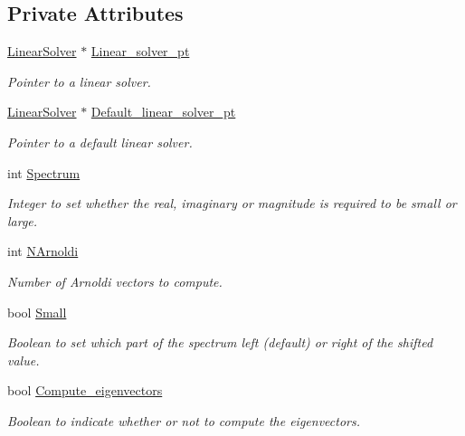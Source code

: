 \subsection*{Private Attributes}
\begin{DoxyCompactItemize}
\item 
\hyperlink{classoomph_1_1LinearSolver}{Linear\+Solver} $\ast$ \hyperlink{classoomph_1_1ARPACK_a647a45676349ba86abd5d2ff9aff022d}{Linear\+\_\+solver\+\_\+pt}
\begin{DoxyCompactList}\small\item\em Pointer to a linear solver. \end{DoxyCompactList}\item 
\hyperlink{classoomph_1_1LinearSolver}{Linear\+Solver} $\ast$ \hyperlink{classoomph_1_1ARPACK_ad6d487dfc1f84d8008e52fc87d83c644}{Default\+\_\+linear\+\_\+solver\+\_\+pt}
\begin{DoxyCompactList}\small\item\em Pointer to a default linear solver. \end{DoxyCompactList}\item 
int \hyperlink{classoomph_1_1ARPACK_a212ff2ad05b73b8f1e4f0d8d10733015}{Spectrum}
\begin{DoxyCompactList}\small\item\em Integer to set whether the real, imaginary or magnitude is required to be small or large. \end{DoxyCompactList}\item 
int \hyperlink{classoomph_1_1ARPACK_a2f430dc8c1a8d890a90a95bdd66e97cc}{N\+Arnoldi}
\begin{DoxyCompactList}\small\item\em Number of Arnoldi vectors to compute. \end{DoxyCompactList}\item 
bool \hyperlink{classoomph_1_1ARPACK_aa92552280868d74242f71c6f98db79e8}{Small}
\begin{DoxyCompactList}\small\item\em Boolean to set which part of the spectrum left (default) or right of the shifted value. \end{DoxyCompactList}\item 
bool \hyperlink{classoomph_1_1ARPACK_af8a6dba4dca423fd67488e34970886df}{Compute\+\_\+eigenvectors}
\begin{DoxyCompactList}\small\item\em Boolean to indicate whether or not to compute the eigenvectors. \end{DoxyCompactList}\end{DoxyCompactItemize}
